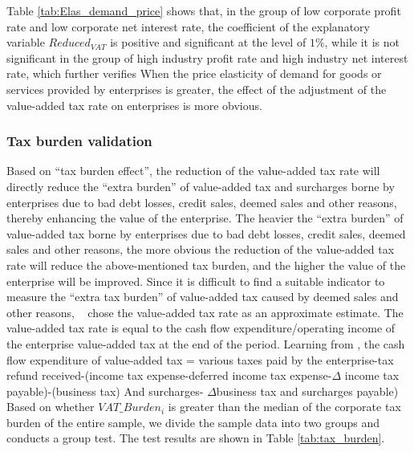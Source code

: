 \documentclass[3p,times]{elsarticle}
\begin{document}
Table \ref{tab:Elas_demand_price} shows that, in the group of low corporate profit rate and low corporate net interest rate, the coefficient of the explanatory variable $Reduced_{VAT}$ is positive and significant at the level of $1\%$, while it is not significant in the group of high industry profit rate and high industry net interest rate, which further verifies When the price elasticity of demand for goods or services provided by enterprises is greater, the effect of the adjustment of the value-added tax rate on enterprises is more obvious.

\subsubsection{Tax burden validation}
Based on “tax burden effect”, the reduction of the value-added tax rate will directly reduce the “extra burden” of value-added tax and surcharges borne by enterprises due to bad debt losses, credit sales, deemed sales and other reasons, thereby enhancing the value of the enterprise. The heavier the “extra burden” of value-added tax borne by enterprises due to bad debt losses, credit sales, deemed sales and other reasons, the more obvious the reduction of the value-added tax rate will reduce the above-mentioned tax burden, and the higher the value of the enterprise will be improved.
Since it is difficult to find a suitable indicator to measure the “extra tax burden” of value-added tax caused by deemed sales and other reasons, {\color{red}~\citep{liu2018theimpact} chose the value-added tax rate as an approximate estimate. The value-added tax rate is equal to the cash flow expenditure/operating income of the enterprise value-added tax at the end of the period. Learning from {\color{blue}{Liu Jun and Liu Feng (2014)}}, the cash flow expenditure of value-added tax = various taxes paid by the enterprise-tax refund received-(income tax expense-deferred income tax expense-$\Delta$ income tax payable)-(business tax) And surcharges- $\Delta$business tax and surcharges payable)}
Based on whether $VAT\_Burden_i$ is greater than the median of the corporate tax burden of the entire sample, we divide the sample data into two groups and conducts a group test. The test results are shown in Table \ref{tab:tax_burden}.
\end{document}
